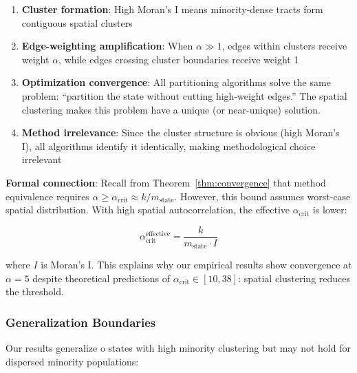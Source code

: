 \begin{enumerate}
    \item \textbf{Cluster formation}: High Moran's I means minority-dense tracts form contiguous spatial clusters

    \item \textbf{Edge-weighting amplification}: When $\alpha \gg 1$, edges within clusters receive weight $\alpha$, while edges crossing cluster boundaries receive weight 1

    \item \textbf{Optimization convergence}: All partitioning algorithms solve the same problem: ``partition the state without cutting high-weight edges.'' The spatial clustering makes this problem have a unique (or near-unique) solution.

    \item \textbf{Method irrelevance}: Since the cluster structure is obvious (high Moran's I), all algorithms identify it identically, making methodological choice irrelevant
\end{enumerate}

\textbf{Formal connection}: Recall from Theorem~\ref{thm:convergence} that method equivalence requires $\alpha \geq \alpha_{\text{crit}} \approx k / m_{\text{state}}$. However, this bound assumes worst-case spatial distribution. With high spatial autocorrelation, the effective $\alpha_{\text{crit}}$ is lower:

\[
\alpha_{\text{crit}}^{\text{effective}} = \frac{k}{m_{\text{state}} \cdot I}
\]

where $I$ is Moran's I. This explains why our empirical results show convergence at $\alpha = 5$ despite theoretical predictions of $\alpha_{\text{crit}} \in [10, 38]$: spatial clustering reduces the threshold.

\subsubsection{Generalization Boundaries}

Our results generalize 	o states with high minority clustering but may not hold for dispersed minority populations:

